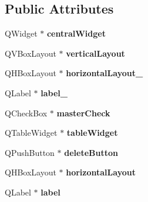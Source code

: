 \subsection*{Public Attributes}
\begin{DoxyCompactItemize}
\item 
\hypertarget{class_ui___main_window_a6600dd3bdd3d55e535659e4a4096ea48}{Q\-Widget $\ast$ {\bfseries central\-Widget}}\label{class_ui___main_window_a6600dd3bdd3d55e535659e4a4096ea48}

\item 
\hypertarget{class_ui___main_window_a649287f742c9a33b8444116dccb1b72b}{Q\-V\-Box\-Layout $\ast$ {\bfseries vertical\-Layout}}\label{class_ui___main_window_a649287f742c9a33b8444116dccb1b72b}

\item 
\hypertarget{class_ui___main_window_a9ee21d2c2bc000e7a8ba931bacfc5a69}{Q\-H\-Box\-Layout $\ast$ {\bfseries horizontal\-Layout\-\_}}\label{class_ui___main_window_a9ee21d2c2bc000e7a8ba931bacfc5a69}

\item 
\hypertarget{class_ui___main_window_a2f5576686ce98bcc41bd1b1eca07e56a}{Q\-Label $\ast$ {\bfseries label\-\_}}\label{class_ui___main_window_a2f5576686ce98bcc41bd1b1eca07e56a}

\item 
\hypertarget{class_ui___main_window_a8d1e96b1497ab37325c7cae014c2f31a}{Q\-Check\-Box $\ast$ {\bfseries master\-Check}}\label{class_ui___main_window_a8d1e96b1497ab37325c7cae014c2f31a}

\item 
\hypertarget{class_ui___main_window_a313ee66c70f96846198ea4a165cb9001}{Q\-Table\-Widget $\ast$ {\bfseries table\-Widget}}\label{class_ui___main_window_a313ee66c70f96846198ea4a165cb9001}

\item 
\hypertarget{class_ui___main_window_abc1222aa546de4fdd85fac3650d12787}{Q\-Push\-Button $\ast$ {\bfseries delete\-Button}}\label{class_ui___main_window_abc1222aa546de4fdd85fac3650d12787}

\item 
\hypertarget{class_ui___main_window_ae7104d878681f568e492c5bd0f653157}{Q\-H\-Box\-Layout $\ast$ {\bfseries horizontal\-Layout}}\label{class_ui___main_window_ae7104d878681f568e492c5bd0f653157}

\item 
\hypertarget{class_ui___main_window_a78edcdd12ea78c06d7e80f322c8882f9}{Q\-Label $\ast$ {\bfseries label}}\label{class_ui___main_window_a78edcdd12ea78c06d7e80f322c8882f9}


\end{DoxyCompactItemize}
